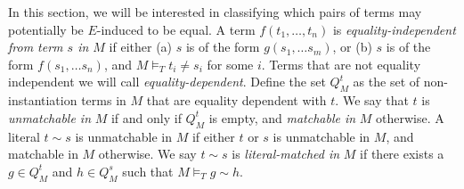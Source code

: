 \documentclass{llncs}
\begin{document}
\begin{comment}

\begin{lemma}
\label{lem:e-ind}
For each $E \in e\_ind(t,g,M,\psi)$, we have that $M \backslash t = g, E \models_T t = g$
\end{lemma}
\begin{proof}
The proof is by induction on the structure of $t$, with the induction hypothesis $M \backslash t = g, E \models_T t = g$.
If $t$ is an instantiation constant, then clearly $M \backslash t = g, t = rep( g ) \models_T t = g$.

Otherwise, the only other relevant case to consider is when $t$ is of the form $f( \bar{t_a} )$ and $g$ is of the form $f( \bar{ g_a } )$ (for all other cases, $e\_ind$ returns the empty set).
By congruence, it suffices to show for each $E$ in the constructed set $S$, we have that all the arguments of $t$ and $g$ are $E$-induced in $M$, or in other words $M \backslash t = g, E \models_T t_1 = g_1 \wedge \ldots \wedge t_n = g_n$.

Say we have constructed a set of equality sets $S_{i-1}$ such that $M \backslash t = g, E \models t_1 = g_1 \wedge \ldots \wedge t_{i-1} = g_{i-1}$ for each $E \in S_{i-1}$.
Our goal is to show that $e\_ind$ constructs an $S_i$ on the $i^{th}$ iteration such that for each $E \in S_i$, $M \backslash t = g, E \models_T t_1 = g_1 \wedge \ldots \wedge t_{i-1} = g_{i-1} \wedge t_i = g_i$.
In the case that $M \models_T t_i = g_i$, then $S_i$ is equal to $S_{i-1}$ and the statement holds immediately.
In the case that $M \not\models_T t_i = g_i$, then we may construct a set $S'$. 
Note that by our induction hypothesis, $M \backslash t_i = g_i, E \models_T t_i = g_i$ for each $E \in S'$.
We take $S_i$ to be the merge of $S_{i-1}$ and $S'$.
Since each $E \in S_i$ contains all equalities from some $E_1 \in S_{i-1}$ and some $E_2 \in S'$, we have that $M \backslash t = g, E \models_T t_1 = g_1 \wedge \ldots \wedge t_{i-1} = g_{i-1} \wedge t_i = g_i$ for each $E \in S_i$. $\Box$
\end{proof}
\end{comment}

In this section, we will be interested in classifying which pairs of terms may potentially be $E$-induced to be equal.
A term $f( t_1, \ldots, t_n )$ is \emph{equality-independent from term $s$ in $M$} if either (a) $s$ is of the form $g( s_1, \ldots s_m )$, or (b) $s$ is of the form $f( s_1, \ldots s_n )$, and $M \models_T t_i \neq s_i$ for some $i$.
Terms that are not equality independent we will call \emph{equality-dependent}.
Define the set $Q^t_M$ as the set of non-instantiation terms in $M$ that are equality dependent with $t$.
We say that $t$ is \emph{unmatchable in} $M$ if and only if $Q^t_M$ is empty, and \emph{matchable in} $M$ otherwise.
A literal $t \sim s$ is unmatchable in $M$ if either $t$ or $s$ is unmatchable in $M$, and matchable in $M$ otherwise.
We say $t \sim s$ is \emph{literal-matched in} $M$ if there exists a $g \in Q^t_M$ and $h \in Q^s_M$ such that $M \models_T g \sim h$.
\end{document}
